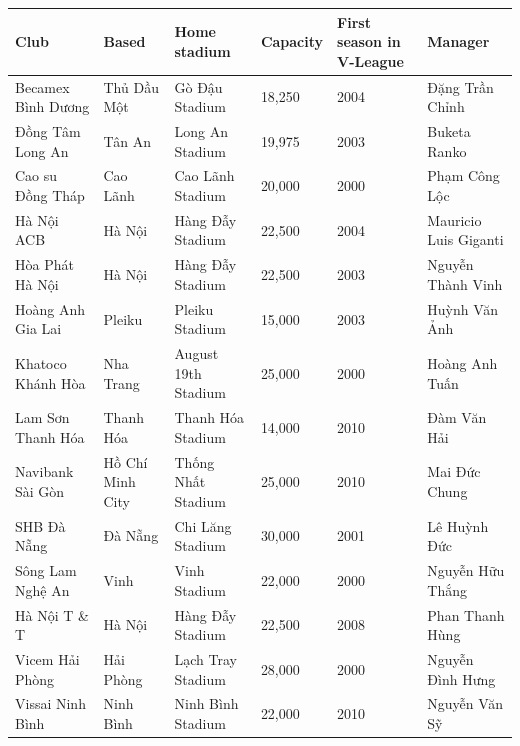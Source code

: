 \documentclass{article}
\begin{document}
\begin{tabular}{llllll}
\toprule
Club & Based & Home stadium & Capacity & First season in V-League & Manager \\
\midrule
Becamex Bình Dương & Thủ Dầu Một & Gò Đậu Stadium & 18,250 & 2004 & Đặng Trần Chỉnh \\
Đồng Tâm Long An & Tân An & Long An Stadium & 19,975 & 2003 & Buketa Ranko \\
Cao su Đồng Tháp & Cao Lãnh & Cao Lãnh Stadium & 20,000 & 2000 & Phạm Công Lộc \\
Hà Nội ACB & Hà Nội & Hàng Đẫy Stadium & 22,500 & 2004 & Mauricio Luis Giganti \\
Hòa Phát Hà Nội & Hà Nội & Hàng Đẫy Stadium & 22,500 & 2003 & Nguyễn Thành Vinh \\
Hoàng Anh Gia Lai & Pleiku & Pleiku Stadium & 15,000 & 2003 & Huỳnh Văn Ảnh \\
Khatoco Khánh Hòa & Nha Trang & August 19th Stadium & 25,000 & 2000 & Hoàng Anh Tuấn \\
Lam Sơn Thanh Hóa & Thanh Hóa & Thanh Hóa Stadium & 14,000 & 2010 & Đàm Văn Hải \\
Navibank Sài Gòn & Hồ Chí Minh City & Thống Nhất Stadium & 25,000 & 2010 & Mai Đức Chung \\
SHB Đà Nẵng & Đà Nẵng & Chi Lăng Stadium & 30,000 & 2001 & Lê Huỳnh Đức \\
Sông Lam Nghệ An & Vinh & Vinh Stadium & 22,000 & 2000 & Nguyễn Hữu Thắng \\
Hà Nội T \& T & Hà Nội & Hàng Đẫy Stadium & 22,500 & 2008 & Phan Thanh Hùng \\
Vicem Hải Phòng & Hải Phòng & Lạch Tray Stadium & 28,000 & 2000 & Nguyễn Đình Hưng \\
Vissai Ninh Bình & Ninh Bình & Ninh Bình Stadium & 22,000 & 2010 & Nguyễn Văn Sỹ \\
\bottomrule
\end{tabular}
\end{document}

